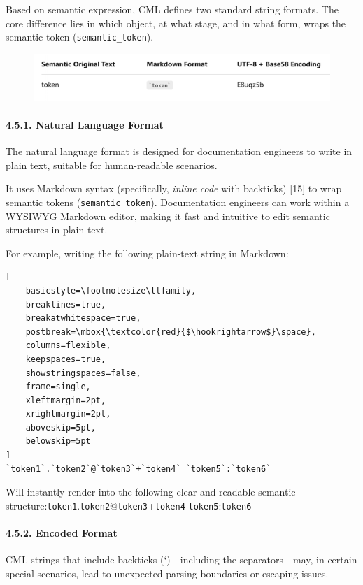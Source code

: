 \documentclass[conference]{IEEEtran}
\begin{document}
Based on semantic expression, CML defines two standard string formats.
The core difference lies in which object, at what stage, and in what
form, wraps the semantic token (\texttt{semantic\_token}).

\begin{figure}[htbp]
\centering
\includegraphics[width=0.8\linewidth]{assets/image-20250421172756701.png}
\end{figure}

\paragraph{4.5.1. Natural Language
Format}\label{451-natural-language-format}

The natural language format is designed for documentation engineers to
write in plain text, suitable for human-readable scenarios.

It uses Markdown syntax (specifically, \emph{inline code} with
backticks) {[}15{]} to wrap semantic tokens (\texttt{semantic\_token}).
Documentation engineers can work within a WYSIWYG Markdown editor,
making it fast and intuitive to edit semantic structures in plain text.

For example, writing the following plain-text string in Markdown:

\begin{lstlisting}[
    basicstyle=\footnotesize\ttfamily,
    breaklines=true,
    breakatwhitespace=true,
    postbreak=\mbox{\textcolor{red}{$\hookrightarrow$}\space},
    columns=flexible,
    keepspaces=true,
    showstringspaces=false,
    frame=single,
    xleftmargin=2pt,
    xrightmargin=2pt,
    aboveskip=5pt,
    belowskip=5pt
]
`token1`.`token2`@`token3`+`token4` `token5`:`token6`
\end{lstlisting}

Will instantly render into the following clear and readable semantic
structure:\texttt{token1}.\texttt{token2}@\texttt{token3}+\texttt{token4}
\texttt{token5}:\texttt{token6}

\paragraph{4.5.2. Encoded Format}\label{452-encoded-format}

CML strings that include backticks (`)---including the separators---may,
in certain special scenarios, lead to unexpected parsing boundaries or
escaping issues.
\end{document}
